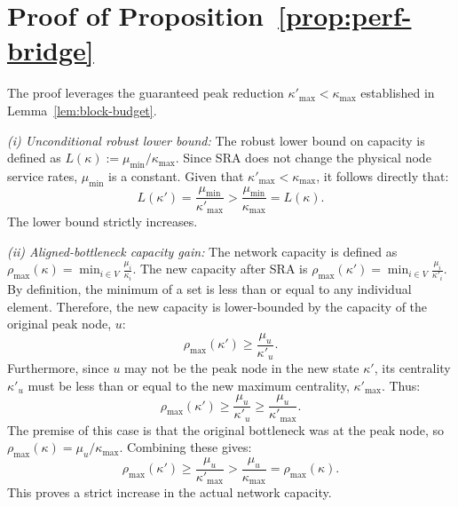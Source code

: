\documentclass[journal]{IEEEtran}
\begin{document}
\section{Proof of Proposition~\ref{prop:perf-bridge}}
\label{app:proof_prop_perf_bridge}
\begin{IEEEproof}
The proof leverages the guaranteed peak reduction $\kappa'_{\max} < \kappa_{\max}$ established in Lemma~\ref{lem:block-budget}.

\noindent\textit{(i) Unconditional robust lower bound:}
The robust lower bound on capacity is defined as $L(\kappa) := \mu_{\min}/\kappa_{\max}$.
Since SRA does not change the physical node service rates, $\mu_{\min}$ is a constant.
Given that $\kappa'_{\max} < \kappa_{\max}$, it follows directly that:
\begin{equation}
L(\kappa') = \frac{\mu_{\min}}{\kappa'_{\max}} > \frac{\mu_{\min}}{\kappa_{\max}} = L(\kappa).
\end{equation}
The lower bound strictly increases.

\noindent\textit{(ii) Aligned-bottleneck capacity gain:}
The network capacity is defined as $\rho_{\max}(\kappa) = \min_{i \in V} \frac{\mu_i}{\kappa_i}$.
The new capacity after SRA is $\rho_{\max}(\kappa') = \min_{i \in V} \frac{\mu_i}{\kappa'_i}$.
By definition, the minimum of a set is less than or equal to any individual element. Therefore, the new capacity is lower-bounded by the capacity of the original peak node, $u$:
\begin{equation}
\rho_{\max}(\kappa') \ge \frac{\mu_u}{\kappa'_u}.
\end{equation}
Furthermore, since $u$ may not be the peak node in the new state $\kappa'$, its centrality $\kappa'_u$ must be less than or equal to the new maximum centrality, $\kappa'_{\max}$. Thus:
\begin{equation}
\rho_{\max}(\kappa') \ge \frac{\mu_u}{\kappa'_u} \ge \frac{\mu_u}{\kappa'_{\max}}.
\end{equation}
The premise of this case is that the original bottleneck was at the peak node, so $\rho_{\max}(\kappa) = \mu_u/\kappa_{\max}$. Combining these gives:
\begin{equation}
\rho_{\max}(\kappa') \ge \frac{\mu_u}{\kappa'_{\max}} > \frac{\mu_u}{\kappa_{\max}} = \rho_{\max}(\kappa).
\end{equation}
This proves a strict increase in the actual network capacity.
\end{IEEEproof}
\end{document}
